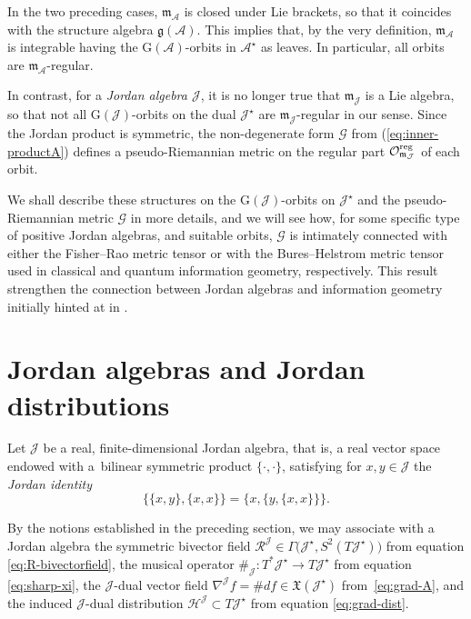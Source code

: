 \documentclass[pdftex]{sigma}
\numberwithin{equation}{section}
\newcommand{\hh}{\mathcal{H}}
\newcommand{\ocal}{\mathcal{O}}
\newcommand{\Jcal}{\mathcal{J}}
\newcommand{\m}{\mathfrak{m}}
\newcommand{\G}{\mathrm{G}}
\newcommand{\g}{{\mathfrak{g}}}
\renewcommand{\m}{{\mathfrak m}}
\newcommand{\cR}{\mathcal{R}}
\newcommand{\cA}{\mathcal{A}}
\newcommand{\Gcal}{\mathcal{G}}
\begin{document}
In the two preceding cases, $\m_\cA$ is closed under Lie brackets, so that it coincides with the structure algebra $\g(\cA)$.
This implies that, by the very definition, $\m_\cA$ is integrable having the $\G(\cA)$-orbits in $\cA^\star$ as leaves.
In particular, all orbits are $\m_\cA$-regular.

In contrast, for a {\em Jordan algebra $\Jcal$}, it is no longer true that $\m_\Jcal$ is a Lie algebra, so that not all $\G(\Jcal)$-orbits on the dual $\Jcal^\star$ are $\m_\Jcal$-regular in our sense.
Since the Jordan product is symmetric,
the non-degenerate form $\Gcal$ from (\ref{eq:inner-productA}) defines a pseudo-Riemannian metric on the regular part $\ocal^{\rm reg}_{\m_\Jcal}$ of each orbit.

We shall describe these structures on the $\G(\Jcal)$-orbits on $\Jcal^\star$ and the pseudo-Riemannian metric $\Gcal$ in more details, and we will see how, for some specific type of positive Jordan algebras, and suitable orbits, $\Gcal$ is intimately connected with either the Fisher--Rao metric tensor or with the Bures--Helstrom metric tensor used in classical and quantum information geometry, respectively.
This result strengthen the connection between Jordan algebras and information geometry initially hinted at in \cite{C-J-S-2020-02,C-J-S-2020}.

\section{Jordan algebras and Jordan distributions}\label{sec: Jordan algebras}

Let $\Jcal$ be a real, finite-dimensional Jordan algebra, that is, a real vector space endowed with a~bilinear symmetric product $\{\cdot,\cdot\}$, satisfying for $x,y\in\Jcal$ the {\em Jordan identity}
\[ %
\{\{x, y\}, \{x, x\}\} = \{x, \{y, \{x, x\}\}\}.
\]

By the notions established in the preceding section, we may associate with a Jordan algebra the symmetric bivector field $\cR^\Jcal \in \Gamma\big(\Jcal^\star, S^2(T\Jcal^\star)\big)$ from equation \eqref{eq:R-bivectorfield}, the musical operator $\#_\Jcal\colon T^\ast \Jcal^\star \to T\Jcal^\star$ from equation \eqref{eq:sharp-xi}, the $\Jcal$-dual vector field $\nabla^\Jcal f = \#df \in \mathfrak{X}(\Jcal^\star)$ from~\eqref{eq:grad-A}, and the induced $\Jcal$-dual distribution $\hh^\Jcal \subset T\Jcal^\star$ from equation \eqref{eq:grad-dist}.
\end{document}
